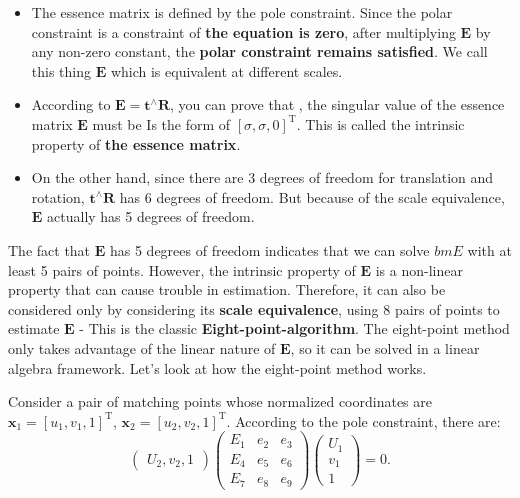 \begin{itemize}
	\item The essence matrix is ​​defined by the pole constraint. Since the polar constraint is a constraint of \textbf{the equation is zero}, after multiplying $\bm{E}$ by any non-zero constant, the \textbf{polar constraint remains satisfied}. We call this thing $\bm{E}$ which is equivalent at different scales.
	\item According to $\bm{E} = \bm{t}^ \wedge \bm{R}$, you can prove that \textsuperscript{\cite{Hartley2003}}, the singular value of the essence matrix $\bm{E}$ must be Is the form of $[\sigma, \sigma, 0]^\mathrm{T}$. This is called the intrinsic property of \textbf{the essence matrix}.
	\item On the other hand, since there are 3 degrees of freedom for translation and rotation, $\bm{t}^\wedge \bm{R}$ has 6 degrees of freedom. But because of the scale equivalence, $\bm{E}$ actually has 5 degrees of freedom.
\end{itemize}

The fact that $\bm{E}$ has 5 degrees of freedom indicates that we can solve $bm{E}$ with at least 5 pairs of points. However, the intrinsic property of $\bm{E}$ is a non-linear property that can cause trouble in estimation. Therefore, it can also be considered only by considering its \textbf{scale equivalence}, using 8 pairs of points to estimate $\bm{E}$ - This is the classic \textbf{Eight-point-algorithm}\textsuperscript{\cite{Hartley1997, Longuet-Higgins1987}}. The eight-point method only takes advantage of the linear nature of $\bm{E}$, so it can be solved in a linear algebra framework. Let's look at how the eight-point method works.

Consider a pair of matching points whose normalized coordinates are $\bm{x}_{1}=[u_{1}, v_{1}, 1]^\mathrm{T}$, $\bm{x }_{2}=[u_{2}, v_{2}, 1]^{\mathrm{T}}$. According to the pole constraint, there are:
\begin{equation}
\begin{pmatrix}
U_{2}, v_{2}, 1
\end{pmatrix}
\begin{pmatrix}
 E_{1} & e_{2} & e_{3}\\
 E_{4} & e_{5} & e_{6}\\
 E_{7} & e_{8} & e_{9}
\end{pmatrix}
\begin{pmatrix}
U_{1}\\v_{1}\\1
\end{pmatrix}
=0.
\end{equation}

